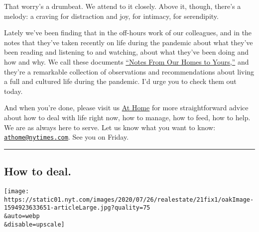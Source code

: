 That worry's a drumbeat. We attend to it closely. Above it, though,
there's a melody: a craving for distraction and joy, for intimacy, for
serendipity.

Lately we've been finding that in the off-hours work of our colleagues,
and in the notes that they've taken recently on life during the pandemic
about what they've been reading and listening to and watching, about
what they've been doing and how and why. We call these documents
\href{https://www.nytimes.com/interactive/2020/at-home/even-more-reporters-editors-diaries-lists-recommendations.html}{``Notes
From Our Homes to Yours,''} and they're a remarkable collection of
observations and recommendations about living a full and cultured life
during the pandemic. I'd urge you to check them out today.

And when you're done, please visit us
\href{http://www.nytimes.com/athome}{At Home} for more straightforward
advice about how to deal with life right now, how to manage, how to
feed, how to help. We are as always here to serve. Let us know what you
want to know:
\href{mailto:athome@nytimes.com}{\nolinkurl{athome@nytimes.com}}. See
you on Friday.

\begin{center}\rule{0.5\linewidth}{\linethickness}\end{center}

\hypertarget{how-to-deal}{%
\subsection{How to deal.}\label{how-to-deal}}

\texttt{[image: https://static01.nyt.com/images/2020/07/26/realestate/21fix1/oakImage-1594923633651-articleLarge.jpg?quality=75\\\&auto=webp\\\&disable=upscale]}

